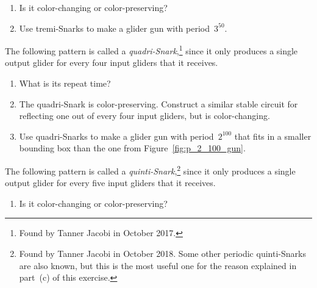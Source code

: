 \begin{multicols}{2}
\begin{problem}
\begin{enumerate}[label=\bf\color{ocre}(\alph*)]
		\item Is it color-changing or color-preserving?%
		
		\item Use tremi-Snarks to make a glider gun with period~$3^{50}$.
	\end{enumerate}
\end{problem}


\mfilbreak


\begin{problem}\label{exer:quadri_snark}
	The following pattern is called a \emph{quadri-Snark},\footnote{Found by Tanner Jacobi in October 2017.} since it only produces a single output glider for every four input gliders that it receives.
	
	\begin{center}
	\end{center}
	
	\begin{enumerate}[label=\bf\color{ocre}(\alph*)]
		\item What is its repeat time?%
		
		\item The quadri-Snark is color-preserving. Construct a similar stable circuit for reflecting one out of every four input gliders, but is color-changing.%
		
		\item Use quadri-Snarks to make a glider gun with period~$2^{100}$ that fits in a smaller bounding box than the one from Figure~\ref{fig:p_2_100_gun}.
	\end{enumerate}
\end{problem}


\mfilbreak


\begin{problem}\label{exer:quinti_snark}
	The following pattern is called a \emph{quinti-Snark},\footnote{Found by Tanner Jacobi in October 2018. Some other periodic quinti-Snarks are also known, but this is the most useful one for the reason explained in part~(c) of this exercise.} since it only produces a single output glider for every five input gliders that it receives.
	
	\begin{center}
	\end{center}
	
	\begin{enumerate}[label=\bf\color{ocre}(\alph*)]
		\item Is it color-changing or color-preserving?%
		

\end{enumerate}
\end{problem}
\end{multicols}
